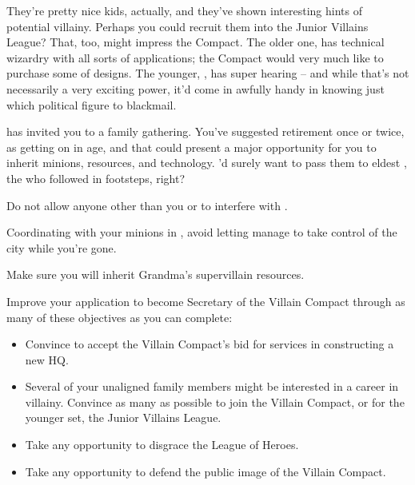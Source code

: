 \documentclass[char]{LRSguildcamp1}
\begin{document}
They're pretty nice kids, actually, and they've shown interesting hints of potential villainy.  Perhaps you could recruit them into the Junior Villains League?  That, too, might impress the Compact.  The older one, \cTeen{} has technical wizardry with all sorts of applications; the Compact would very much like to purchase some of \cTeen{\their} designs.  The younger, \cTween{}, has super hearing -- and while that's not necessarily a very exciting power, it'd come in awfully handy in knowing just which political figure to blackmail.

\cGrandma{\Parent} has invited you to a family gathering.  You've suggested retirement once or twice, as \cGrandma{\theyare} getting on in age, and that could present a major opportunity for you to inherit \cGrandma{\their} minions, resources, and technology.  \cGrandma{\They}'d surely want to pass them to \cGrandma{\their} eldest \cOldest{\offspring}, the \cOldest{\villain} who followed in \cGrandma{\their} footsteps,  right?

\begin{itemz}[Goals]
	\item Do not allow anyone other than you or \cOS{} to interfere with \pCityO{}.  %
	\item Coordinating with your minions in \pCityO{}, avoid letting \cOS{} manage to take control of the city while you're gone.
	\item Make sure you will inherit Grandma's supervillain resources. %
	\item Improve your application to become Secretary of the Villain Compact through as many of these objectives as you can complete:
	\begin{itemize}
		\item Convince \cArchitect{} to accept the Villain Compact's bid for \cArchitect{\their} services in constructing a new HQ.
		\item Several of your unaligned family members might be interested in a career in villainy.  Convince as many as possible to join the Villain Compact, or for the younger set, the Junior Villains League.
		\item Take any opportunity to disgrace the League of Heroes.
		\item Take any opportunity to defend the public image of the Villain Compact.  %
	\end{itemize}
\end{itemz}
\end{document}
